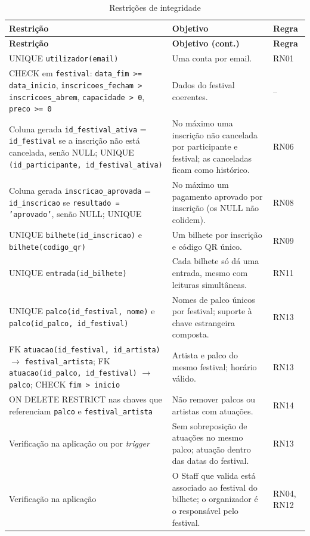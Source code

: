 \begin{longtable}{|p{6.0cm}|p{6.0cm}|l|}
\caption{Restrições de integridade}\label{tab:integridade}\\
\hline
\textbf{Restrição} & \textbf{Objetivo} & \textbf{Regra} \\ \hline
\endfirsthead
\hline
\textbf{Restrição} & \textbf{Objetivo (cont.)} & \textbf{Regra} \\ \hline
\endhead
UNIQUE \texttt{utilizador(email)} & Uma conta por email. & RN01 \\ \hline
CHECK em \texttt{festival}: \texttt{data\_fim >= data\_inicio},
  \texttt{inscricoes\_fecham > inscricoes\_abrem}, \texttt{capacidade > 0},
  \texttt{preco >= 0} & Dados do festival coerentes. & -- \\ \hline
Coluna gerada \texttt{id\_festival\_ativa} = \texttt{id\_festival} se a
  inscrição não está cancelada, senão NULL; UNIQUE
  \texttt{(id\_participante, id\_festival\_ativa)} & No máximo uma inscrição
  não cancelada por participante e festival; as canceladas ficam como
  histórico. & RN06 \\ \hline
Coluna gerada \texttt{inscricao\_aprovada} = \texttt{id\_inscricao} se
  \texttt{resultado = 'aprovado'}, senão NULL; UNIQUE & No máximo um pagamento
  aprovado por inscrição (os NULL não colidem). & RN08 \\ \hline
UNIQUE \texttt{bilhete(id\_inscricao)} e \texttt{bilhete(codigo\_qr)} & Um
  bilhete por inscrição e código QR único. & RN09 \\ \hline
UNIQUE \texttt{entrada(id\_bilhete)} & Cada bilhete só dá uma entrada, mesmo
  com leituras simultâneas. & RN11 \\ \hline
UNIQUE \texttt{palco(id\_festival, nome)} e \texttt{palco(id\_palco,
  id\_festival)} & Nomes de palco únicos por festival; suporte à chave
  estrangeira composta. & RN13 \\ \hline
FK \texttt{atuacao(id\_festival, id\_artista)} $\rightarrow$
  \texttt{festival\_artista}; FK \texttt{atuacao(id\_palco, id\_festival)}
  $\rightarrow$ \texttt{palco}; CHECK \texttt{fim > inicio} & Artista e palco
  do mesmo festival; horário válido. & RN13 \\ \hline
ON DELETE RESTRICT nas chaves que referenciam \texttt{palco} e
  \texttt{festival\_artista} & Não remover palcos ou artistas com atuações.
  & RN14 \\ \hline
Verificação na aplicação ou por \emph{trigger} & Sem sobreposição de
  atuações no mesmo palco; atuação dentro das datas do festival. & RN13 \\ \hline
Verificação na aplicação & O Staff que valida está associado ao festival do
  bilhete; o organizador é o responsável pelo festival. & RN04, RN12 \\ \hline
\end{longtable}

